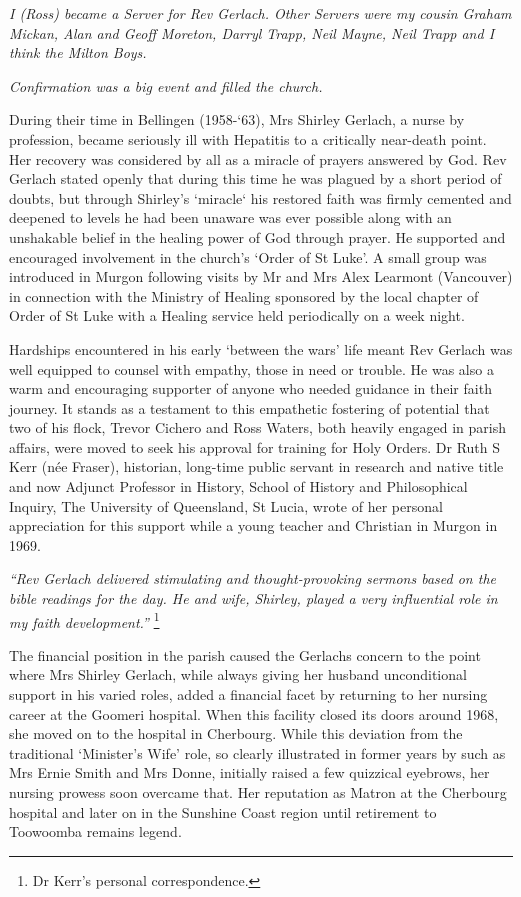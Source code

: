 \emph{I (Ross) became a Server for Rev Gerlach. Other Servers were my cousin Graham Mickan, Alan and Geoff Moreton, Darryl Trapp, Neil Mayne, Neil Trapp and I think the Milton Boys.}

\emph{Confirmation was a big event and filled the church.}

During their time in Bellingen (1958-`63), Mrs Shirley Gerlach, a nurse by profession, became seriously ill with Hepatitis to a critically near-death point. Her recovery was considered by all as a miracle of prayers answered by God. Rev Gerlach stated openly that during this time he was plagued by a short period of doubts, but through Shirley's `miracle` his restored faith was firmly cemented and deepened to levels he had been unaware was ever possible along with an unshakable belief in the healing power of God through prayer. He supported and encouraged involvement in the church's `Order of St Luke'. A small group was introduced in Murgon following visits by Mr and Mrs Alex Learmont (Vancouver) in connection with the Ministry of Healing sponsored by the local chapter of Order of St Luke with a Healing service held periodically on a week night.

Hardships encountered in his early `between the wars' life meant Rev Gerlach was well equipped to counsel with empathy, those in need or trouble. He was also a warm and encouraging supporter of anyone who needed guidance in their faith journey. It stands as a testament to this empathetic fostering of potential that two of his flock, Trevor Cichero and Ross Waters, both heavily engaged in parish affairs, were moved to seek his approval for training for Holy Orders. Dr Ruth S Kerr (née Fraser), historian, long-time public servant in research and native title and now Adjunct Professor in History, School of History and Philosophical Inquiry, The University of Queensland, St Lucia, wrote of her personal appreciation for this support while a young teacher and Christian in Murgon in 1969.

\emph{``Rev Gerlach delivered stimulating and thought-provoking sermons based on the bible readings for the day. He and wife, Shirley, played a very influential role in my faith development.''} \footnote{Dr Kerr's personal correspondence.}

The financial position in the parish caused the Gerlachs concern to the point where Mrs Shirley Gerlach, while always giving her husband unconditional support in his varied roles, added a financial facet by returning to her nursing career at the Goomeri hospital. When this facility closed its doors around 1968, she moved on to the hospital in Cherbourg. While this deviation from the traditional `Minister's Wife' role, so clearly illustrated in former years by such as Mrs Ernie Smith and Mrs Donne, initially raised a few quizzical eyebrows, her nursing prowess soon overcame that. Her reputation as Matron at the Cherbourg hospital and later on in the Sunshine Coast region until retirement to Toowoomba remains legend.

